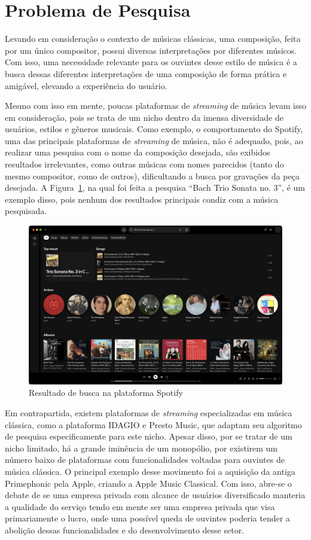\documentclass[12pt]{article}
\begin{document}
\section{Problema de Pesquisa}

Levando em consideração o contexto de músicas clássicas, uma composição, feita
por um único compositor, possui diversas interpretações por diferentes músicos.
Com isso, uma necessidade relevante para os ouvintes desse estilo de música é a
busca dessas diferentes interpretações de uma composição de forma prática e
amigável, elevando a experiência do usuário.

Mesmo com isso em mente, poucas plataformas de \emph{streaming} de música levam
isso em consideração, pois se trata de um nicho dentro da imensa diversidade de
usuários, estilos e gêneros musicais.
Como exemplo, o comportamento do Spotify, uma das principais plataformas de
\emph{streaming} de música, não é adequado, pois, ao realizar uma pesquisa com o
nome da composição desejada, são exibidos resultados irrelevantes, como outras
músicas com nomes parecidos (tanto do mesmo compositor, como de outros), 
dificultando a busca por gravações da peça desejada.
A Figura~\ref{fig:spotify}, na qual foi feita a pesquisa ``Bach Trio Sonata no. 3'',
é um exemplo disso, pois nenhum dos resultados principais condiz com a música
pesquisada.

\begin{figure}[ht]
\centering
\includegraphics[width=1\textwidth]{figuras/Spotify.png}
\caption{Resultado de busca na plataforma Spotify}
\label{fig:spotify}
\end{figure}

Em contrapartida, existem plataformas de \emph{streaming} especializadas em
música clássica, como a plataforma IDAGIO e Presto Music, que adaptam seu
algoritmo de pesquisa especificamente para este nicho. Apesar disso, por se
tratar de um nicho limitado, há a grande iminência de um monopólio, por
existirem um número baixo de plataformas com funcionalidades voltadas para
ouvintes de música clássica. O principal exemplo desse movimento foi a aquisição
da antiga Primephonic pela Apple, criando a Apple Music Classical. Com isso,
abre-se o debate de se uma empresa privada com alcance de usuários diversificado
manteria a qualidade do serviço tendo em mente ser uma empresa privada que visa
primariamente o lucro, onde uma possível queda de ouvintes poderia tender a
abolição dessas funcionalidades e do desenvolvimento desse setor.
\end{document}
